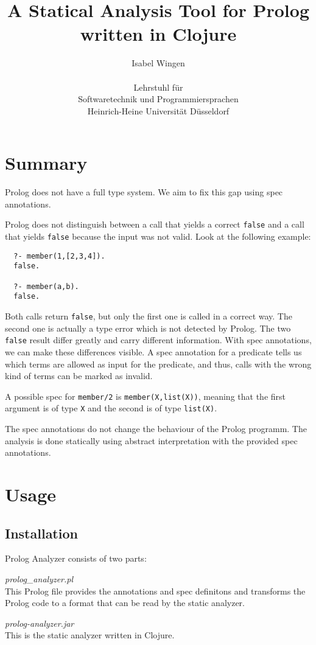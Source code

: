 \documentclass[a4paper]{article}
\title{A Statical Analysis Tool for Prolog written in Clojure}
\author{Isabel Wingen\\ \\Lehrstuhl f\"ur\\Softwaretechnik und
  Programmiersprachen\\Heinrich-Heine Universit\"at D\"usseldorf}
\newcommand{\false}{\texttt{false}}
\newcommand{\X}{\texttt{X}}
\newcommand{\listX}{\texttt{list(X)}}
\newcommand{\prologPart}{\textit{prolog\_analyzer.pl}}
\newcommand{\jarPart}{\textit{prolog-analyzer.jar}}
\begin{document}
\maketitle
\tableofcontents
\newpage
\section{Summary}
Prolog does not have a full type system. We aim to fix this
gap using spec annotations.

Prolog does not distinguish between a call that yields a correct \false{} and a
call that yields \false{} because the input was not valid.
Look at the following example:
\begin{lstlisting}
  ?- member(1,[2,3,4]).
  false.

  ?- member(a,b).
  false.
\end{lstlisting}
Both calls return \false{}, but only the first one is called in a correct way.
The second one is actually a type error which is not detected by Prolog.
The two \false{} result differ greatly and carry different information.
With spec annotations, we can make these differences visible. A spec annotation
for a predicate tells us which terms are allowed as input for the predicate,
and thus, calls with the wrong kind of terms can be marked as invalid.

A possible spec for \texttt{member/2} is \texttt{member(X,list(X))}, meaning
that the first argument is of type \X{} and the second is of type \listX{}.


The spec annotations do not change the behaviour of the Prolog programm. The
analysis is done statically using abstract interpretation with the provided spec annotations.

\section{Usage}
\subsection{Installation}
Prolog Analyzer consists of two parts:
\begin{description}
\item{\prologPart{}}\hfill\\
  This Prolog file provides the annotations and spec definitons and transforms the Prolog code
  to a format that can be read by the static analyzer.
\item{\jarPart{}}\hfill\\
  This is the static analyzer written in Clojure.
\end{description}
\end{document}

